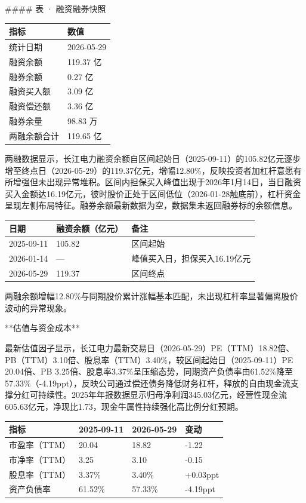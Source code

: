 \documentclass[12pt,a4paper]{article}
\begin{document}
\#\#\#\# 表 · 融资融券快照

\begin{table}[htbp]
\centering
\begin{tabular}{ll}
\toprule
指标 & 数值 \\
\midrule
统计日期 & 2026-05-29 \\
融资余额 & 119.37 亿 \\
融券余额 & 0.27 亿 \\
融资买入额 & 3.09 亿 \\
融资偿还额 & 3.36 亿 \\
融券余量 & 98.83 万 \\
两融余额合计 & 119.65 亿 \\
\bottomrule
\end{tabular}
\end{table}


两融数据显示，长江电力融资余额自区间起始日（2025-09-11）的105.82亿元逐步增至终点日（2026-05-29）的119.37亿元，增幅12.80\%，反映投资者加杠杆意愿有所增强但未出现异常堆积。区间内担保买入峰值出现于2026年1月14日，当日融资买入金额达16.19亿元，彼时股价正处于区间低位（2026-01-28触底前），杠杆资金呈现左侧布局特征。融券余额最新数据为空，数据集未返回融券标的余额信息。

\begin{table}[htbp]
\centering
\begin{tabular}{lll}
\toprule
日期 & 融资余额（亿元） & 备注 \\
\midrule
2025-09-11 & 105.82 & 区间起始 \\
2026-01-14 & — & 峰值买入日，担保买入16.19亿元 \\
2026-05-29 & 119.37 & 区间终点 \\
\bottomrule
\end{tabular}
\end{table}


两融余额增幅12.80\%与同期股价累计涨幅基本匹配，未出现杠杆率显著偏离股价波动的异常现象。

**估值与资金成本**

最新估值因子显示，长江电力最新交易日（2026-05-29）PE（TTM）18.82倍、PB（TTM）3.10倍、股息率（TTM）3.40\%，较区间起始日（2025-09-11）PE 20.04倍、PB 3.25倍、股息率3.37\%呈压缩态势，同期资产负债率由61.52\%降至57.33\%（-4.19ppt），反映公司通过偿还债务降低财务杠杆，释放的自由现金流支撑分红可持续性。2025年年报数据显示归母净利润345.03亿元，经营性现金流605.63亿元，净现比1.73，现金牛属性持续强化高比例分红预期。

\begin{table}[htbp]
\centering
\begin{tabular}{llll}
\toprule
指标 & 2025-09-11 & 2026-05-29 & 变动 \\
\midrule
市盈率（TTM） & 20.04 & 18.82 & -1.22 \\
市净率（TTM） & 3.25 & 3.10 & -0.15 \\
股息率（TTM） & 3.37\% & 3.40\% & +0.03ppt \\
资产负债率 & 61.52\% & 57.33\% & -4.19ppt \\
\bottomrule
\end{tabular}
\end{table}
\end{document}
